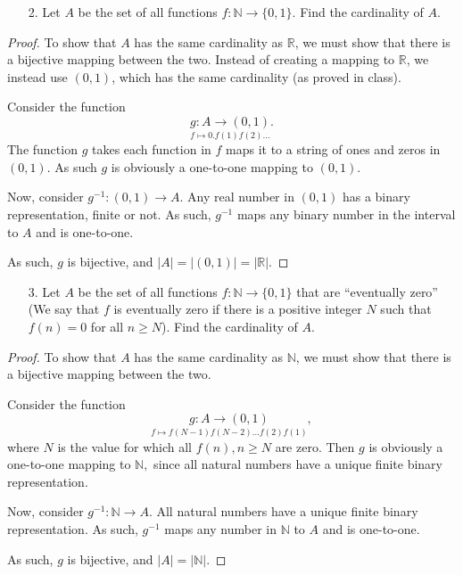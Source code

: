 \documentclass[10pt]{article}
\theoremstyle{definition}
\theoremstyle{plain}
\newcommand{\N}{\mathbb{N}}
\newcommand{\R}{\mathbb{R}}
\begin{document}
\pagebreak



\begin{enumerate}
\item[2.] Let $A$ be the set of all functions $f:\N \to \{0,1\}$.  Find the cardinality of $A$.
\end{enumerate}

\begin{proof}
  To show that $A$ has the same cardinality as $\R$, we must show that there is a bijective mapping between the two. Instead of creating a mapping to $\R$, we instead use $(0,1)$, which has the same cardinality (as proved in class).

  Consider the function
  $$\underset{f\mapsto 0.f(1)f(2)\dots}{g:A \to (0,1)}.$$
  The function $g$ takes each function in $f$ maps it to a string of ones and zeros in $(0,1)$. As such $g$ is obviously a one-to-one mapping to $(0,1)$.

  Now, consider $g^{-1}: (0,1) \to A$. Any real number in $(0,1)$ has a binary representation, finite or not. As such, $g^{-1}$ maps any binary number in the interval to $A$ and is one-to-one.

  As such, $g$ is bijective, and $|A|=|(0,1)|=|\R|$.
\end{proof}



\pagebreak



\begin{enumerate}
\item[3.] Let $A$ be the set of all functions $f:\N \to \{0,1\}$ that are ``eventually zero'' (We say that $f$ is eventually zero if there is a positive integer $N$ such that $f(n) = 0$ for all $n \geq N$).  Find the cardinality of $A$.
\end{enumerate}

\begin{proof}
  To show that $A$ has the same cardinality as $\N$, we must show that there is a bijective mapping between the two.

  Consider the function
  $$\underset{f\mapsto f(N-1)f(N-2)\dots f(2)f(1)}{g:A \to (0,1)},$$
  where $N$ is the value for which all $f(n), n\geq N$ are zero. Then $g$ is obviously a one-to-one mapping to $\N,$ since all natural numbers have a unique finite binary representation.

  Now, consider $g^{-1}: \N \to A$. All natural numbers have a unique finite binary representation. As such, $g^{-1}$ maps any number in $\N$ to $A$ and is one-to-one.

  As such, $g$ is bijective, and $|A|=|\N|$.
\end{proof}
\end{document}
